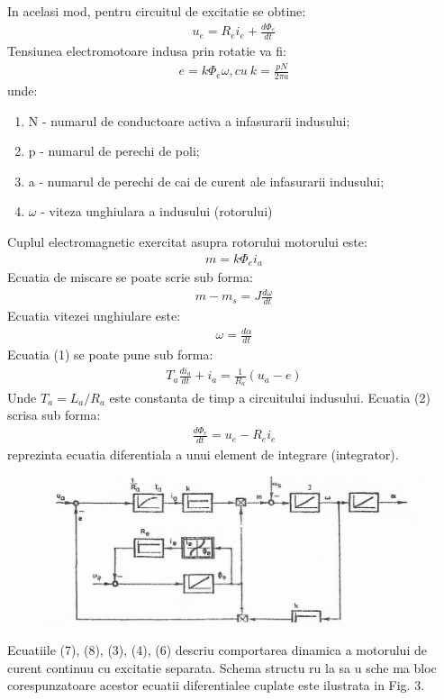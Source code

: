 \documentclass[11pt]{article}
\begin{document}
In acelasi mod, pentru circuitul de excitatie se obtine:
\begin{align}
u_e=R_ei_e+\frac{d\Phi_e}{dt}
\end{align}
Tensiunea electromotoare indusa prin rotatie va fi:
\begin{align}
e=k\Phi_e\omega, cu\ k = \frac{pN}{2\pi a}
\end{align}
unde:
\begin{enumerate}[label=$\bullet$]
	\item N - numarul de conductoare activa a infasurarii indusului;
	\item p - numarul de perechi de poli; 
	\item a - numarul de perechi de cai de curent ale infasurarii indusului;
	\item $\omega$ - viteza unghiulara a indusului (rotorului)  
\end{enumerate}
Cuplul electromagnetic exercitat asupra rotorului motorului este:
\begin{align}
m=k\Phi_ei_a
\end{align}
Ecuatia de miscare se poate scrie sub forma:
\begin{align}
m-m_s=J\frac{d\omega}{dt}
\end{align}
Ecuatia vitezei unghiulare este:
\begin{align}
\omega=\frac{d\alpha}{dt}
\end{align}
Ecuatia (1) se poate pune sub forma:
\begin{align}
T_a\frac{di_a}{dt}+i_a=\frac{1}{R_a}(u_a-e)
\end{align}
Unde $T_a=L_a/R_a$  este constanta de timp a circuitului indusului.
Ecuatia (2) scrisa sub forma:
\begin{align}
\frac{d\Phi_e}{dt}=u_e-R_ei_e
\end{align}
reprezinta ecuatia diferentiala a unui element de integrare (integrator).
\begin{figure}[H]
	\centering
	\includegraphics[width=.8\linewidth]{fig4.png}
	\label{fig:test2}
\end{figure}
Ecuatiile (7), (8), (3), (4), (6) descriu comportarea dinamica a motorului de curent continuu cu excitatie separata. Schema structu ru la sa u sche ma bloc corespunzatoare acestor ecuatii diferentialee cuplate este ilustrata in Fig. 3.
\end{document}
